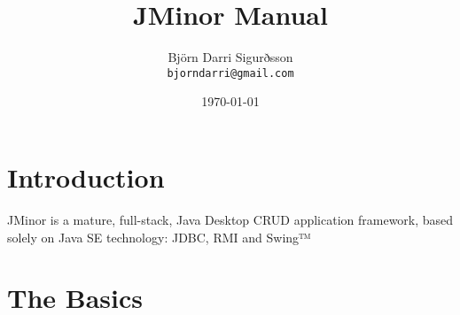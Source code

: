 \documentclass[12pt]{report}
\begin{document}
\title{JMinor Manual}
\author{Björn Darri Sigurðsson\\
    \texttt{bjorndarri@gmail.com}}
\date{\today}
\maketitle

\section{Introduction}

JMinor is a mature, full-stack, Java Desktop CRUD application framework, based solely on Java SE technology: JDBC, RMI and Swing™

\section{The Basics}
\end{document}

